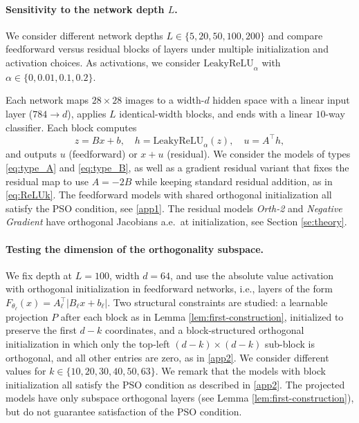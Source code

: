\documentclass{article}
\theoremstyle{plain}
\theoremstyle{definition}
\theoremstyle{definition}
\theoremstyle{remark}
\theoremstyle{definition}
\theoremstyle{definition}
\theoremstyle{remark}
\numberwithin{equation}{section}
\begin{document}
\paragraph{Sensitivity to the network depth $L$.}
We consider different network depths $L\in\{5,20,50,100,200\}$ and compare feedforward versus residual blocks of layers under multiple initialization and activation choices. As activations, we consider $\mathrm{LeakyReLU}_{\alpha}$ with $\alpha\in\{0,0.01,0.1,0.2\}$. 

Each network maps $28\times 28$ images to a width-$d$ hidden space with a linear input layer ($784 \to d$), applies $L$ identical-width blocks, and ends with a linear $10$-way classifier. Each block computes
\[
z = Bx + b,\quad h = \mathrm{LeakyReLU}_{\alpha}(z),\quad u = A^\top h,
\]
and outputs $u$ (feedforward) or $x+u$ (residual). We consider the models of types \ref{eq:type_A} and \ref{eq:type_B}, as well as a gradient residual variant that fixes the residual map to use $ A =- 2B$ while keeping standard residual addition, as in \eqref{eq:ReLUk}. The feedforward models with shared orthogonal initialization all satisfy the PSO condition, see \ref{app1}. The residual models \textit{Orth-2} and \textit{Negative Gradient} have orthogonal Jacobians a.e.\, at initialization, see Section \ref{se:theory}.


\paragraph{Testing the dimension of the orthogonality subspace.}
We fix depth at $L=100$, width $d=64$, and use the absolute value activation with orthogonal initialization in feedforward networks, i.e., layers of the form $F_{\theta_\ell}(x)=A_\ell^\top|B_\ell x + b_\ell|$. Two structural constraints are studied: a learnable projection $P$ after each block as in Lemma \ref{lem:first-construction}, initialized to preserve the first $d-k$ coordinates, and a block-structured orthogonal initialization in which only the top-left $(d-k)\times(d-k)$ sub-block is orthogonal, and all other entries are zero, as in \ref{app2}. We consider different values for $k\in\{10,20,30,40,50,63\}$. We remark that the models with block initialization all satisfy the PSO condition as described in \ref{app2}. The projected models have only subspace orthogonal layers (see Lemma \ref{lem:first-construction}), but do not guarantee satisfaction of the PSO condition.
\end{document}
